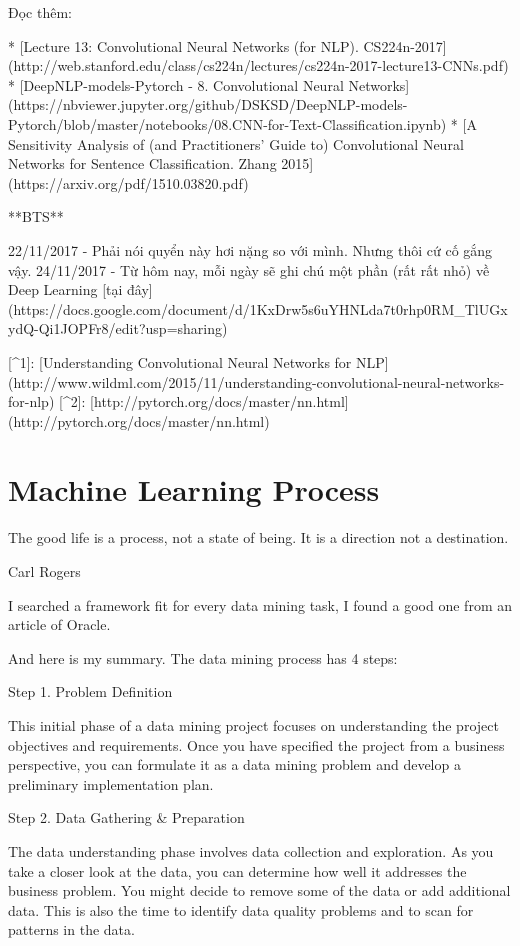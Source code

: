 Đọc thêm:

* [Lecture 13: Convolutional Neural Networks (for NLP). CS224n-2017](http://web.stanford.edu/class/cs224n/lectures/cs224n-2017-lecture13-CNNs.pdf)
* [DeepNLP-models-Pytorch - 8. Convolutional Neural Networks](https://nbviewer.jupyter.org/github/DSKSD/DeepNLP-models-Pytorch/blob/master/notebooks/08.CNN-for-Text-Classification.ipynb)
* [A Sensitivity Analysis of (and Practitioners’ Guide to) Convolutional Neural Networks for Sentence Classification. Zhang 2015](https://arxiv.org/pdf/1510.03820.pdf)

**BTS**

22/11/2017 - Phải nói quyển này hơi nặng so với mình. Nhưng thôi cứ cố gắng vậy.
24/11/2017 - Từ hôm nay, mỗi ngày sẽ ghi chú một phần (rất rất nhỏ) về Deep Learning [tại đây](https://docs.google.com/document/d/1KxDrw5s6uYHNLda7t0rhp0RM_TlUGxydQ-Qi1JOPFr8/edit?usp=sharing)

[^1]: [Understanding Convolutional Neural Networks for NLP](http://www.wildml.com/2015/11/understanding-convolutional-neural-networks-for-nlp)
[^2]: [http://pytorch.org/docs/master/nn.html](http://pytorch.org/docs/master/nn.html)

\section{Machine Learning Process}

The good life is a process, not a state of being. It is a direction not a destination.

Carl Rogers



I searched a framework fit for every data mining task, I found a good one from an article of Oracle.

And here is my summary. The data mining process has 4 steps:

Step 1. Problem Definition

This initial phase of a data mining project focuses on understanding the project objectives and requirements. Once you have specified the project from a business perspective, you can formulate it as a data mining problem and develop a preliminary implementation plan.

Step 2. Data Gathering & Preparation

The data understanding phase involves data collection and exploration. As you take a closer look at the data, you can determine how well it addresses the business problem. You might decide to remove some of the data or add additional data. This is also the time to identify data quality problems and to scan for patterns in the data.

